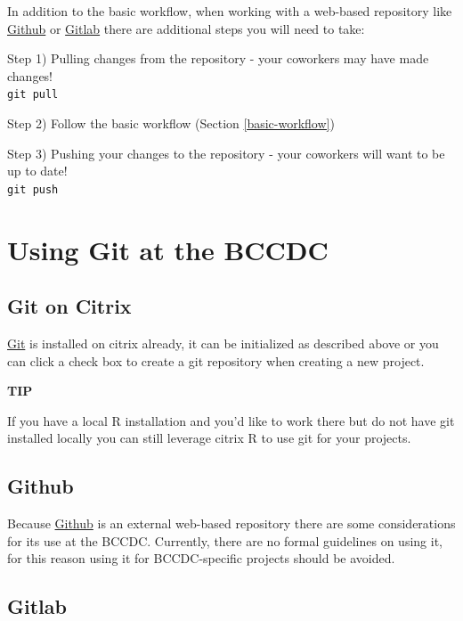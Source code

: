 \documentclass[
]{book}
\begin{document}
In addition to the basic workflow, when working with a web-based repository like \href{https://github.com/}{Github} or \href{https://about.gitlab.com/}{Gitlab} there are additional steps you will need to take:

Step 1) Pulling changes from the repository - your coworkers may have made changes!\\
\texttt{git\ pull}

Step 2) Follow the basic workflow (Section \ref{basic-workflow})

Step 3) Pushing your changes to the repository - your coworkers will want to be up to date!\\
\texttt{git\ push}

\hypertarget{using-git-at-the-bccdc}{%
\section{Using Git at the BCCDC}\label{using-git-at-the-bccdc}}

\hypertarget{git-on-citrix}{%
\subsection{Git on Citrix}\label{git-on-citrix}}

\href{https://git-scm.com/}{Git} is installed on citrix already, it can be initialized as described above or you can click a check box to create a git repository when creating a new project.

\textbf{TIP}

If you have a local R installation and you'd like to work there but do not have git installed locally you can still leverage citrix R to use git for your projects.

\hypertarget{github}{%
\subsection{Github}\label{github}}

Because \href{https://github.com/}{Github} is an external web-based repository there are some considerations for its use at the BCCDC. Currently, there are no formal guidelines on using it, for this reason using it for BCCDC-specific projects should be avoided.

\hypertarget{gitlab}{%
\subsection{Gitlab}\label{gitlab}}
\end{document}
